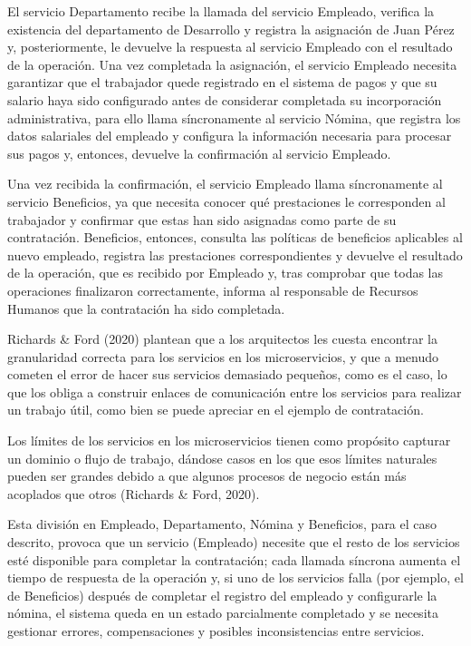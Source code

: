 \documentclass[12pt, a4paper]{article}
\begin{document}
    El servicio Departamento recibe la llamada del servicio Empleado, verifica la existencia del departamento de Desarrollo y registra la asignación de Juan Pérez y, posteriormente, le devuelve la respuesta al servicio Empleado con el resultado de la operación. Una vez completada la asignación, el servicio Empleado necesita garantizar que el trabajador quede registrado en el sistema de pagos y que su salario haya sido configurado antes de considerar completada su incorporación administrativa, para ello llama síncronamente al servicio Nómina, que registra los datos salariales del empleado y configura la información necesaria para procesar sus pagos y, entonces, devuelve la confirmación al servicio Empleado.

    Una vez recibida la confirmación, el servicio Empleado llama síncronamente al servicio Beneficios, ya que necesita conocer qué prestaciones le corresponden al trabajador y confirmar que estas han sido asignadas como parte de su contratación. Beneficios, entonces, consulta las políticas de beneficios aplicables al nuevo empleado, registra las prestaciones correspondientes y devuelve el resultado de la operación, que es recibido por Empleado y, tras comprobar que todas las operaciones finalizaron correctamente, informa al responsable de Recursos Humanos que la contratación ha sido completada.

    Richards \& Ford (2020) plantean que a los arquitectos les cuesta encontrar la granularidad correcta para los servicios en los microservicios, y que a menudo cometen el error de hacer sus servicios demasiado pequeños, como es el caso, lo que los obliga a construir enlaces de comunicación entre los servicios para realizar un trabajo útil, como bien se puede apreciar en el ejemplo de contratación.

    Los límites de los servicios en los microservicios tienen como propósito capturar un dominio o flujo de trabajo, dándose casos en los que esos límites naturales pueden ser grandes debido a que algunos procesos de negocio están más acoplados que otros (Richards \& Ford, 2020).

    Esta división en Empleado, Departamento, Nómina y Beneficios, para el caso descrito, provoca que un servicio (Empleado) necesite que el resto de los servicios esté disponible para completar la contratación; cada llamada síncrona aumenta el tiempo de respuesta de la operación y, si uno de los servicios falla (por ejemplo, el de Beneficios) después de completar el registro del empleado y configurarle la nómina, el sistema queda en un estado parcialmente completado y se necesita gestionar errores, compensaciones y posibles inconsistencias entre servicios.
\end{document}
